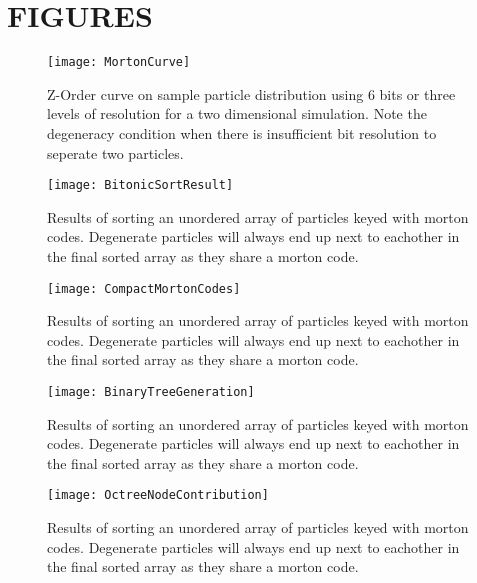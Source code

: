 \documentclass{thesis}
\begin{document}
\appendix    %
\chapter{FIGURES}
\begin{figure}[h]
    \caption{Z-Order curve on sample particle distribution using 6 bits or three levels of resolution for a two dimensional simulation.  Note the degeneracy condition when there is insufficient bit resolution to seperate two particles.}
    \label{fig:MortonCurve}
    \centering
    \texttt{[image: MortonCurve]}
\end{figure}
\clearpage
\begin{figure}[h]
    \caption{Results of sorting an unordered array of particles keyed with morton codes. Degenerate particles will always end up next to eachother in the final sorted array as they share a morton code.}
    \label{fig:BitonicSortResult}
    \centering
    \texttt{[image: BitonicSortResult]}
\end{figure}
\clearpage
\begin{sidewaysfigure}[h]
    \label{fig:CompactMortonCodes}
    \centering
    \texttt{[image: CompactMortonCodes]}
    \caption{Results of sorting an unordered array of particles keyed with morton codes. Degenerate particles will always end up next to eachother in the final sorted array as they share a morton code.}
\end{sidewaysfigure}
\clearpage
\begin{sidewaysfigure}[h]
    \label{fig:BinaryTreeGeneration}
    \centering
    \texttt{[image: BinaryTreeGeneration]}
    \caption{Results of sorting an unordered array of particles keyed with morton codes. Degenerate particles will always end up next to eachother in the final sorted array as they share a morton code.}
\end{sidewaysfigure}
\clearpage
\begin{sidewaysfigure}[h]
    \label{fig:OctreeNodeContribution}
    \centering
    \texttt{[image: OctreeNodeContribution]}
    \caption{Results of sorting an unordered array of particles keyed with morton codes. Degenerate particles will always end up next to eachother in the final sorted array as they share a morton code.}
\end{sidewaysfigure}
\end{document}
